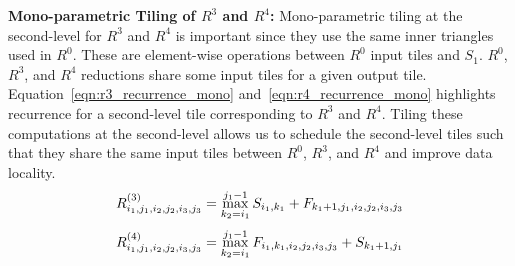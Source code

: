 \textbf{Mono-parametric Tiling of $R^{3}$ and $R^{4}$:}
Mono-parametric tiling at the second-level for $R^{3}$ and $R^{4}$ is important since they use the same inner triangles used in $R^{0}$. These are element-wise operations between $R^{0}$ input tiles and $S_{1}$. $R^{0}$, $R^{3}$, and $R^{4}$ reductions share some input tiles for a given output tile. Equation~\ref{eqn:r3_recurrence_mono} and~\ref{eqn:r4_recurrence_mono} highlights recurrence for a second-level tile corresponding to $R^{3}$ and $R^{4}$. Tiling these computations at the second-level allows us to schedule the second-level tiles such that they share the same input tiles between $R^{0}$, $R^{3}$, and $R^{4}$ and improve data locality.
\begin{equation}
\label{eqn:r3_recurrence_mono}
R^{(3)}_{i_{1},j_{1},i_{2},j_{2}, i_{3}, j_{3}} = 
    \max\limits_{k_{2}=i_{1}}^{j_{1}-1} S_{i_{1},k_{1}} + F_{k_{1}+1,j_{1}, i_{2}, j_{2}, i_{3}, j_{3}}\\
\end{equation}
\begin{equation}
\label{eqn:r4_recurrence_mono}
R^{(4)}_{i_{1},j_{1},i_{2},j_{2}, i_{3}, j_{3}} = 
    \max\limits_{k_{2}=i_{1}}^{j_{1}-1}  F_{i_{1},k_{1}, i_{2}, j_{2}, i_{3}, j_{3}} + S_{k_{1}+1,j_{1}}\\
\end{equation}


